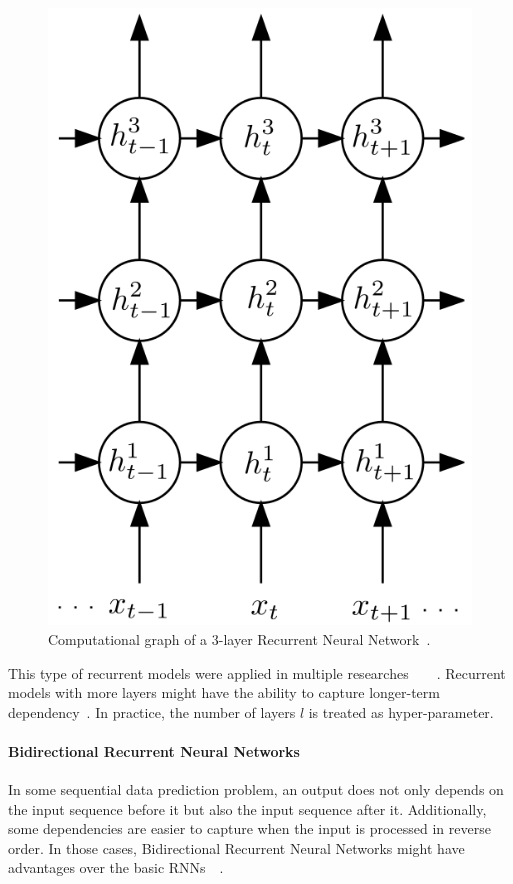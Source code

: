 \begin{figure}[H]
    \centering
    \includegraphics[scale=0.4]{figure/3-layer-lstm}
    \caption[3-layer Recurrent Neural Network]{Computational graph of a 3-layer Recurrent Neural Network~\cite{GravesLSTM}.}
    \label{fig:3-layer-lstm}
\end{figure}

This type of recurrent models were applied in multiple researches~\cite{GravesLSTM}~\cite{SutskeverVL14}~\cite{ZarembaS14}~\cite{treeLSTM}.
Recurrent models with more layers might have the ability to capture longer-term dependency~\cite{treeLSTM}.
In practice, the number of layers \(l\) is treated as hyper-parameter.

\paragraph{Bidirectional Recurrent Neural Networks}\label{sec:bilstm}
In some sequential data prediction problem, an output does not only depends on the input sequence before it but also the input sequence after it.
Additionally, some dependencies are easier to capture when the input is processed in reverse order.
In those cases, Bidirectional Recurrent Neural Networks might have advantages over the basic RNNs~\cite{GravesLSTM}~\cite{Graves-thesis}.

